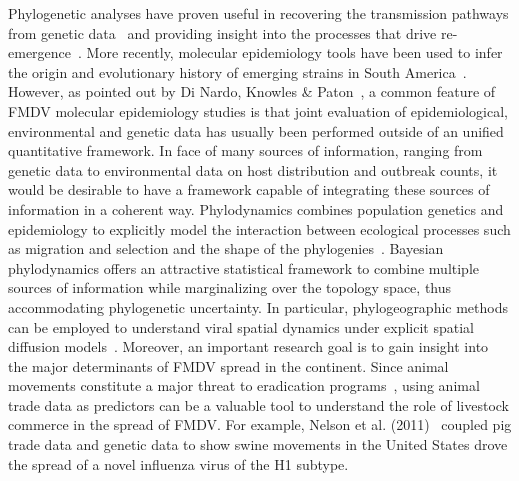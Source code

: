 \documentclass[10pt]{article}
\begin{document}
Phylogenetic analyses have proven useful in recovering the transmission pathways from genetic data~\cite{cottam2007, cottam2008} and providing insight into the processes that drive re-emergence~\cite{combining}.
More recently, molecular epidemiology tools have been used to infer the origin and evolutionary history of emerging strains in South America~\cite{Perez2001, Malirat2007, andean, Malirat2011, Maradei2013}.
However, as pointed out by Di Nardo, Knowles \& Paton~\cite{combining}, a common feature of FMDV molecular epidemiology studies is that  joint evaluation of epidemiological, environmental and genetic data has usually been performed outside of an unified quantitative framework.
In face of many sources of information, ranging from genetic data to environmental data on host distribution and outbreak counts, it would be desirable to have a framework capable of integrating these sources of information in a coherent way.
Phylodynamics combines population genetics and epidemiology to explicitly  model the interaction between ecological processes such as migration and selection and the shape of the phylogenies~\cite{grenfell, vphylodynamics}.
Bayesian phylodynamics offers an attractive statistical framework to combine multiple sources of information while marginalizing over the topology space, thus accommodating phylogenetic uncertainty.
In particular, phylogeographic methods can be employed to understand viral spatial dynamics under explicit spatial diffusion models~\cite{roots}.
Moreover, an important research goal is to gain insight into the major determinants of FMDV spread in the continent.
Since animal movements constitute a major threat to eradication programs~\cite{movements}, using animal trade data as predictors can be a valuable tool to understand the role of livestock commerce in the spread of FMDV.
For example, Nelson et al. (2011)~\cite{Nelson2011} coupled pig trade data and genetic data to show swine movements in the United States drove the spread of a novel influenza virus of the H1 subtype.
\end{document}
